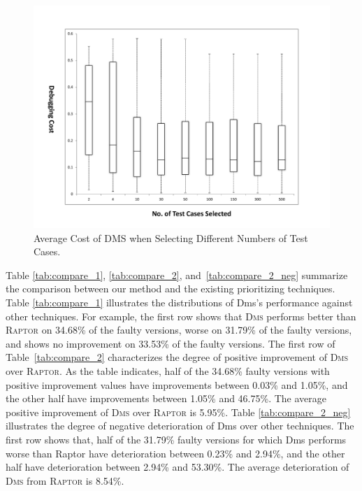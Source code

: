 \begin{figure}[tbp]
    \centering
    \includegraphics[width=12cm]{mut-sdm.pdf}
    \caption{Average Cost of DMS when Selecting Different Numbers of Test Cases.}\label{fig:costmulti}

\end{figure}

\vspace{0.2cm}
 Table \ref{tab:compare_1}, \ref{tab:compare_2}, and~\ref{tab:compare_2_neg} summarize the comparison between our method and the existing prioritizing techniques.
Table \ref{tab:compare_1} illustrates the distributions of {\sc Dms}'s performance against other techniques. For example, the first row shows that \textsc{Dms} performs better than \textsc{Raptor} on 34.68\% of the faulty versions, worse on 31.79\% of the faulty versions, and shows no improvement on 33.53\% of the faulty versions. The first row of Table~\ref{tab:compare_2} characterizes the degree of positive improvement of \textsc{Dms} over \textsc{Raptor}. As the table indicates, half of the 34.68\% faulty versions with positive improvement values have improvements between 0.03\% and 1.05\%, and the other half have improvements between 1.05\% and 46.75\%. The average positive improvement of \textsc{Dms} over \textsc{Raptor} is 5.95\%.
Table \ref{tab:compare_2_neg} illustrates the degree of negative deterioration of {\sc Dms} over other techniques. The first row shows that, half of the 31.79\% faulty versions for which {\sc Dms} performs worse than {\sc Raptor} have deterioration between 0.23\% and 2.94\%, and the other half have deterioration between 2.94\% and 53.30\%. The average deterioration of \textsc{Dms} from \textsc{Raptor} is 8.54\%.

